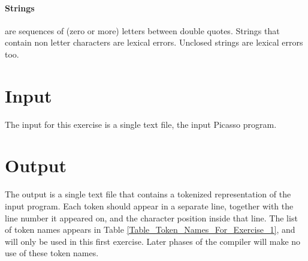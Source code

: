 \documentclass{article}
\begin{document}
\paragraph{Strings} are sequences of (zero or more) letters between double quotes.
Strings that contain non letter characters are lexical errors.
Unclosed strings are lexical errors too.
\section{Input}
The input for this exercise is a single text file, the input Picasso program.
\section{Output}
The output is a single text file that contains a tokenized representation of the input program.
Each token should appear in a separate line, together with the line number
it appeared on, and the character position inside that line.
The list of token names appears in Table \ref{Table_Token_Names_For_Exercise_1},
and will only be used in this first exercise.
Later phases of the compiler will make no use of these token names.
\end{document}

